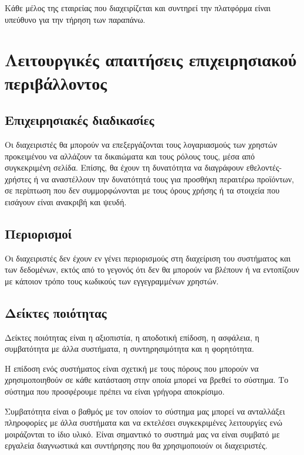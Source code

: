 \documentclass[12pt, oneside, a4paper]{report}
\begin{document}
\hspace{0.6cm}Κάθε μέλος της εταιρείας που διαχειρίζεται και συντηρεί την πλατφόρμα είναι υπεύθυνο για την τήρηση των παραπάνω.

\section{Λειτουργικές απαιτήσεις επιχειρησιακού περιβάλλοντος}
\subsection{Επιχειρησιακές διαδικασίες}
\hspace{0.6cm}Οι διαχειριστές θα μπορούν να επεξεργάζονται τους λογαριασμούς των χρηστών προκειμένου να αλλάζουν τα δικαιώματα και τους ρόλους τους, μέσα από συγκεκριμένη σελίδα. Επίσης, θα έχουν τη δυνατότητα να διαγράφουν εθελοντές-χρήστες ή να αναστέλλουν την δυνατότητά τους για προσθήκη περαιτέρω προϊόντων, σε περίπτωση που δεν συμμορφώνονται με τους όρους χρήσης ή τα στοιχεία που εισάγουν είναι ανακριβή και ψευδή.

\subsection{Περιορισμοί}
\hspace{0.6cm}Οι διαχειριστές δεν έχουν εν γένει περιορισμούς στη διαχείριση του συστήματος και των δεδομένων, εκτός από το γεγονός ότι δεν θα μπορούν να βλέπουν ή να εντοπίζουν με κάποιον τρόπο τους κωδικούς των εγγεγραμμένων χρηστών.

\subsection{Δείκτες ποιότητας}
\hspace{0.6cm}Δείκτες ποιότητας είναι η αξιοπιστία, η αποδοτική επίδοση, η ασφάλεια, η συμβατότητα με άλλα συστήματα, η συντηρησιμότητα και η φορητότητα.

\hspace{0.6cm}Η επίδοση ενός συστήματος είναι σχετική με τους πόρους που μπορούν να χρησιμοποιηθούν σε κάθε κατάσταση στην οποία μπορεί να βρεθεί το σύστημα. Το σύστημα που προσφέρουμε πρέπει να είναι γρήγορα αποκρίσιμο. 

\hspace{0.6cm}Συμβατότητα είναι ο βαθμός με τον οποίον το σύστημα μας μπορεί να ανταλλάξει πληροφορίες με άλλα συστήματα και να εκτελέσει συγκεκριμένες λειτουργίες ενώ μοιράζονται το ίδιο υλικό. Είναι σημαντικό το συστημά μας να είναι συμβατό με εργαλεία διαγνωστικά και συντήρησης που θα χρησιμοποιούν οι διαχειριστές.
\end{document}
